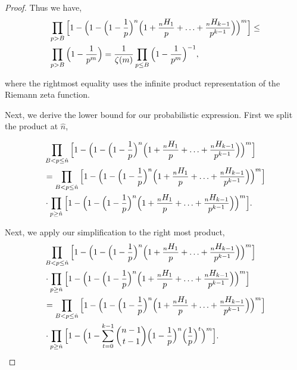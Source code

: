 \documentclass[10pt,a4paper]{article}
\begin{document}
\begin{proof}
			Thus we have,
			\begin{align*}
				&\prod_{p>B} \Big[1 - \Big(1 -\Big(1-\frac{1}{p}\Big)^n\Big(1+\frac{{}_nH_1}{p}+\mathellipsis+\frac{{}_nH_{k-1}}{p^{k-1}}\Big)\Big)^m\Big] \leq \\
				&\prod_{p>B} \Big(1 - \frac{1}{p^m}\Big) = \frac{1}{\zeta(m)} \prod_{p\leq B} \Big(1 - \frac{1}{p^m}\Big)^{-1},
			\end{align*}
			
			where the rightmost equality uses the infinite product representation of the Riemann zeta function.
			
			\vspace{.1 in}
			
			Next, we derive the lower bound for our probabilistic expression. First we split the product at $\hat{n}$,
			
			\begin{align*}
				&\prod_{B<p\leq\hat{n}} \Big[1 - \Big(1 -\Big(1-\frac{1}{p}\Big)^n\Big(1+\frac{{}_nH_1}{p}+\mathellipsis+\frac{{}_nH_{k-1}}{p^{k-1}}\Big)\Big)^m\Big]\\
				&=\prod_{B<p\leq\hat{n}} \Big[1 - \Big(1 -\Big(1-\frac{1}{p}\Big)^n\Big(1+\frac{{}_nH_1}{p}+\mathellipsis+\frac{{}_nH_{k-1}}{p^{k-1}}\Big)\Big)^m\Big]\\
				&\cdot\prod_{p\geq\hat{n}} \Big[1 - \Big(1 -\Big(1-\frac{1}{p}\Big)^n\Big(1+\frac{{}_nH_1}{p}+\mathellipsis+\frac{{}_nH_{k-1}}{p^{k-1}}\Big)\Big)^m\Big].\\
			\end{align*}
			
			Next, we apply our simplification to the right most product,
			\begin{align*}
				&\prod_{B<p\leq\hat{n}} \Big[1 - \Big(1 -\Big(1-\frac{1}{p}\Big)^n\Big(1+\frac{{}_nH_1}{p}+\mathellipsis+\frac{{}_nH_{k-1}}{p^{k-1}}\Big)\Big)^m\Big]\\
				&\cdot\prod_{p\geq\hat{n}} \Big[1 - \Big(1 -\Big(1-\frac{1}{p}\Big)^n\Big(1+\frac{{}_nH_1}{p}+\mathellipsis+\frac{{}_nH_{k-1}}{p^{k-1}}\Big)\Big)^m\Big]\\
				&=\prod_{B<p\leq\hat{n}} \Big[1 - \Big(1 -\Big(1-\frac{1}{p}\Big)^n\Big(1+\frac{{}_nH_1}{p}+\mathellipsis+\frac{{}_nH_{k-1}}{p^{k-1}}\Big)\Big)^m\Big]\\
				&\cdot\prod_{p\geq\hat{n}} \Big[1 - \Big(1 -\sum_{t=0}^{k-1}\binom{n-1}{t-1}\Big(1-\frac{1}{p}\Big)^n\Big(\frac{1}{p}\Big)^t\Big)^m\Big].
			\end{align*}
			

\end{proof}
\end{document}
